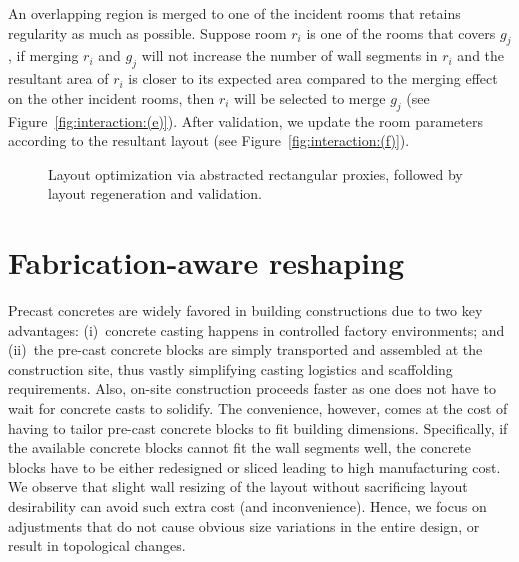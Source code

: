 An overlapping region is merged to one of the incident rooms that retains regularity as much as possible. Suppose room $r_i$ is one of the rooms that covers $g_j$, if merging $r_i$ and $g_j$ will not increase the number of wall segments in $r_i$ and the resultant area of $r_i$ is closer to its expected area compared to the merging effect on the other incident rooms, then $r_i$ will be selected to merge $g_j$ (see Figure~\ref{fig:interaction:(e)}). After validation, we update the room parameters according to the resultant layout (see Figure~\ref{fig:interaction:(f)}).

\begin{figure}[t!]
\centering
{}
\caption{Layout optimization via abstracted rectangular proxies, followed by layout regeneration and validation.}
\label{fig:interaction}
\vspace{-.1in}
\end{figure}

\section{Fabrication-aware reshaping}
\label{sec:fabrication}

Precast concretes are widely favored in building constructions due to two key advantages: (i)~concrete casting happens in controlled factory environments; and (ii)~the pre-cast concrete blocks are simply transported and assembled at the construction site, thus vastly simplifying casting logistics and scaffolding requirements. Also, on-site construction proceeds faster as one does not have to wait for concrete casts to solidify. The convenience, however, comes at the cost of having to tailor pre-cast concrete blocks to fit building dimensions. Specifically, if the available concrete blocks cannot fit the wall segments well, the concrete blocks have to be either redesigned or sliced leading to high manufacturing cost. We observe that slight wall resizing of the layout without sacrificing layout desirability can avoid such extra cost (and inconvenience). Hence, we focus on adjustments that do not cause obvious size variations in the entire design, or result in topological changes.

